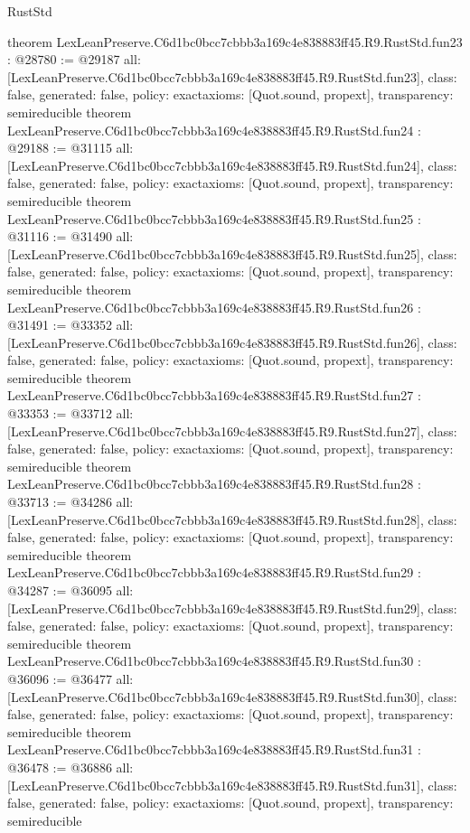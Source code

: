 \begin{lexlean}{RustStd}
\begin{coremodule}
{}
theorem LexLeanPreserve.C6d1bc0bcc7cbbb3a169c4e838883ff45.R9.RustStd.fun23 : @28780 := @29187 {
  all: [LexLeanPreserve.C6d1bc0bcc7cbbb3a169c4e838883ff45.R9.RustStd.fun23],
  class: false,
  generated: false,
  policy: exact{axioms: [Quot.sound, propext]},
  transparency: semireducible
}
theorem LexLeanPreserve.C6d1bc0bcc7cbbb3a169c4e838883ff45.R9.RustStd.fun24 : @29188 := @31115 {
  all: [LexLeanPreserve.C6d1bc0bcc7cbbb3a169c4e838883ff45.R9.RustStd.fun24],
  class: false,
  generated: false,
  policy: exact{axioms: [Quot.sound, propext]},
  transparency: semireducible
}
theorem LexLeanPreserve.C6d1bc0bcc7cbbb3a169c4e838883ff45.R9.RustStd.fun25 : @31116 := @31490 {
  all: [LexLeanPreserve.C6d1bc0bcc7cbbb3a169c4e838883ff45.R9.RustStd.fun25],
  class: false,
  generated: false,
  policy: exact{axioms: [Quot.sound, propext]},
  transparency: semireducible
}
theorem LexLeanPreserve.C6d1bc0bcc7cbbb3a169c4e838883ff45.R9.RustStd.fun26 : @31491 := @33352 {
  all: [LexLeanPreserve.C6d1bc0bcc7cbbb3a169c4e838883ff45.R9.RustStd.fun26],
  class: false,
  generated: false,
  policy: exact{axioms: [Quot.sound, propext]},
  transparency: semireducible
}
theorem LexLeanPreserve.C6d1bc0bcc7cbbb3a169c4e838883ff45.R9.RustStd.fun27 : @33353 := @33712 {
  all: [LexLeanPreserve.C6d1bc0bcc7cbbb3a169c4e838883ff45.R9.RustStd.fun27],
  class: false,
  generated: false,
  policy: exact{axioms: [Quot.sound, propext]},
  transparency: semireducible
}
theorem LexLeanPreserve.C6d1bc0bcc7cbbb3a169c4e838883ff45.R9.RustStd.fun28 : @33713 := @34286 {
  all: [LexLeanPreserve.C6d1bc0bcc7cbbb3a169c4e838883ff45.R9.RustStd.fun28],
  class: false,
  generated: false,
  policy: exact{axioms: [Quot.sound, propext]},
  transparency: semireducible
}
theorem LexLeanPreserve.C6d1bc0bcc7cbbb3a169c4e838883ff45.R9.RustStd.fun29 : @34287 := @36095 {
  all: [LexLeanPreserve.C6d1bc0bcc7cbbb3a169c4e838883ff45.R9.RustStd.fun29],
  class: false,
  generated: false,
  policy: exact{axioms: [Quot.sound, propext]},
  transparency: semireducible
}
theorem LexLeanPreserve.C6d1bc0bcc7cbbb3a169c4e838883ff45.R9.RustStd.fun30 : @36096 := @36477 {
  all: [LexLeanPreserve.C6d1bc0bcc7cbbb3a169c4e838883ff45.R9.RustStd.fun30],
  class: false,
  generated: false,
  policy: exact{axioms: [Quot.sound, propext]},
  transparency: semireducible
}
theorem LexLeanPreserve.C6d1bc0bcc7cbbb3a169c4e838883ff45.R9.RustStd.fun31 : @36478 := @36886 {
  all: [LexLeanPreserve.C6d1bc0bcc7cbbb3a169c4e838883ff45.R9.RustStd.fun31],
  class: false,
  generated: false,
  policy: exact{axioms: [Quot.sound, propext]},
  transparency: semireducible
}
\end{coremodule}
\end{lexlean}
